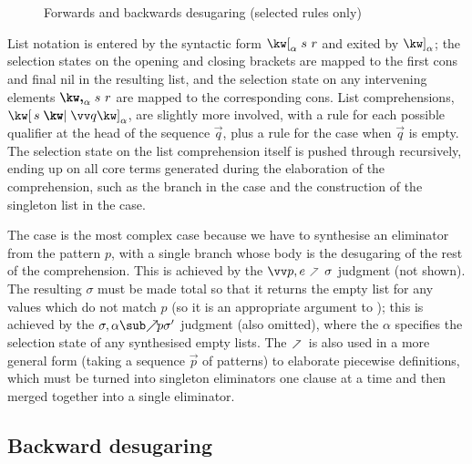\begin{figure}
   
   
   \caption{Forwards and backwards desugaring (selected rules only)}
   \label{fig:surface-language:desugar}
\end{figure}

List notation is entered by the syntactic form $\annList{s}{r}{\alpha}$ and exited by $\annListEnd{\alpha}$; the selection states on the opening and closing brackets are mapped to the first cons and final nil in the resulting list, and the selection state on any intervening elements $\annListNext{s}{r}{\alpha}$ are mapped to the corresponding cons. List comprehensions, $\annListComp{s}{\vec{q}}{\alpha}$, are slightly more involved, with a rule for each possible qualifier at the head of the sequence $\vec{q}$, plus a rule for the case when $\vec{q}$ is empty. The selection state on the list comprehension itself is pushed through recursively, ending up on all core terms generated during the elaboration of the comprehension, such as the  branch in the  case and the construction of the singleton list in the  case.

The  case is the most complex case because we have to synthesise an eliminator from the pattern $p$, with a single branch whose body is the desugaring of the rest of the comprehension. This is achieved by the $\vec{p}, e \clauseFwdR \sigma$ judgment (not shown). The resulting $\sigma$ must be made total so that it returns the empty list for any values which do not match $p$ (so it is an appropriate argument to ); this is achieved by the $\totaliseFwd{\sigma}{\alpha}{p}{\sigma'}$ judgment (also omitted), where the $\alpha$ specifies the selection state of any synthesised empty lists. The $\clauseFwdR$ is also used in a more general form (taking a sequence $\vec{p}$ of patterns) to elaborate piecewise definitions, which must be turned into singleton eliminators one clause at a time and then merged together into a single eliminator.

\subsection{Backward desugaring}

